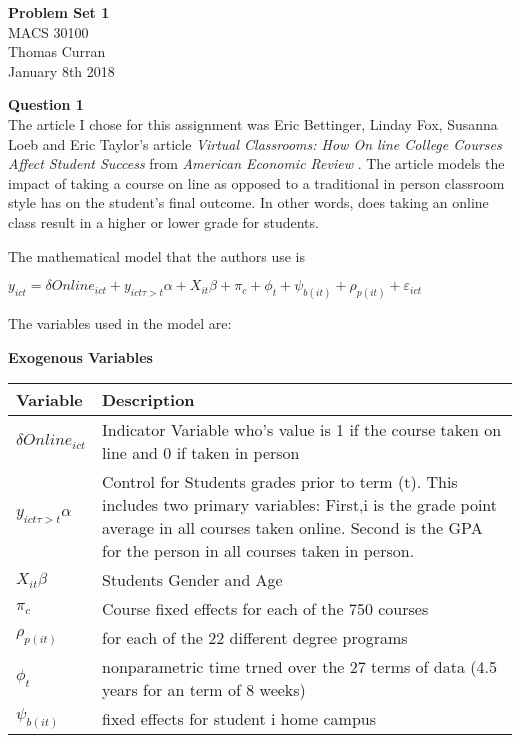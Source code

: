 \documentclass[11pt]{article}
\begin{document}
\begin{flushleft}
	\textbf{Problem Set 1}\\
	MACS 30100\\
	Thomas Curran \\ 
	January 8th 2018
\end{flushleft}

\noindent\textbf{Question 1}\\

The article I chose for this assignment was Eric Bettinger, Linday Fox, Susanna Loeb and Eric Taylor's article \textit{Virtual Classrooms: How On line College Courses Affect Student Success} from \textit{American Economic Review} \cite{q1}. The article models the impact of taking a course on line as opposed to a traditional in person classroom style has on the student's final outcome. In other words, does taking an online class result in a higher or lower grade for students.

The mathematical model that the authors use is \\

{\centering $y_{ict} = \delta Online_{ict} +y_{ict\tau>t}\alpha + X_{it}\beta + \pi_{c} + \phi_{t} + \psi_{b(it)} + \rho_{p(it)} +\varepsilon_{ict}$\par}

\vspace{5mm}
The variables used in the model are: 

\begin{table}[htbp]
\centering
\textbf{Exogenous Variables}
\hline\hline
	\begin{tabular}{|p{4.15cm} |  p{}|}
		Variable & Description \\ \hline
		 $\delta Online_{ict}$ & Indicator Variable who's value is 1 if the course taken on line and 0  if taken in person\\ \hline
		 $y_{ict\tau>t}\alpha$ & Control for Students grades prior to term (t). This includes two primary variables: First,i  is the grade point average in all courses taken online. Second is the GPA for the person in all courses taken in person. \\ \hline
		 $X_{it}\beta$& Students Gender and Age\\ \hline
		 $\pi_{c}$ & Course fixed effects for each of the 750 courses\\ \hline
		 $\rho_{p(it)}$ & for each of the 22 different degree programs\\ \hline
		 $\phi_{t}$ & nonparametric time trned over the 27 terms of data (4.5 years for an term of 8 weeks)\\ \hline
		 $\psi_{b(it)}$ & fixed effects for student i home campus\\ \hline	
	\end{tabular}
\end{table} 
\end{document}
